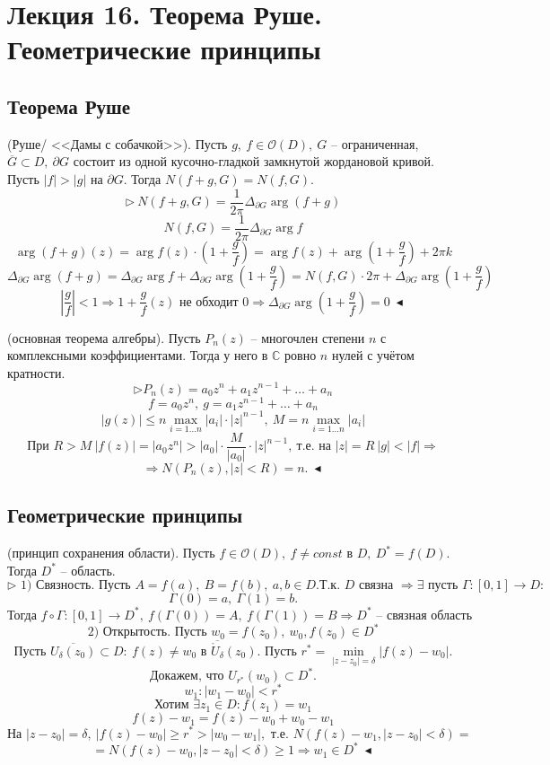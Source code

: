 \section{Лекция 16. Теорема Руше. Геометрические принципы}
\subsection{Теорема Руше}
 (Руше/ <<Дамы с собачкой>>). Пусть $g, \ f \in \mathcal{O}(D), \ G$ -- ограниченная, $\overline{G} \subset D, \ \partial G$ состоит из одной кусочно-гладкой замкнутой жордановой кривой.
Пусть $|f|>|g|$ на $\partial G$. Тогда $N(f+g, G) = N(f, G)$.
\[\triangleright \ N(f+g, G) = \frac{1}{2\pi} \Delta_{\partial G} \arg (f+g)\]
\[N(f, G) = \frac{1}{2\pi} \Delta_{\partial G} \arg f\]
\[\arg (f+g)(z) = \arg f(z) \cdot \left(1+\frac{g}{f}\right)= \arg f(z) + \arg \left(1+\frac{g}{f}\right) + 2\pi k\]
\[\Delta_{\partial G} \arg (f+g) = \Delta_{\partial G} \arg f + \Delta_{\partial G} \arg \left(1+\frac{g}{f}\right) = N(f, G) \cdot 2\pi + \Delta_{\partial G} \arg \left(1+\frac{g}{f}\right)\]
\[\left|\frac{g}{f}\right| < 1 \Rightarrow 1 + \frac{g}{f}(z) \text{ не обходит 0} \Rightarrow \Delta_{\partial G} \arg \left(1+\frac{g}{f}\right) = 0 \ \blacktriangleleft\]

 (основная теорема алгебры). Пусть $P_n(z)$ -- многочлен степени $n$ с комплексными коэффициентами. Тогда у него в $ \mathbb{C}$ ровно $n$ нулей с учётом кратности.
\[\triangleright P_n(z) = a_0 z^n + a_1 z^{n-1} + \ldots + a_n\]
\[f = a_0 z^n, \ g = a_1 z^{n-1} + \ldots + a_n\]
\[|g(z)|  \leq n \max_{i=1\ldots n} |a_i| \cdot |z|^{n-1}, \ M = n \max_{i=1\ldots n} |a_i|\]
\[\text{При } R > M \ |f(z)| = |a_0 z^n| > |a_0| \cdot \frac{M}{|a_0|} \cdot |z|^{n-1}, \ \text{т.е. на } |z| = R \ |g| < |f| \Rightarrow\] 
\[\Rightarrow N(P_n(z), |z| < R) = n. \ \blacktriangleleft\]
\subsection{Геометрические принципы}
 (принцип сохранения области). Пусть $f \in \mathcal{O}(D), \ f \neq const$ в $D, \ D^* = f(D)$. Тогда $D^*$ -- область.
\[\triangleright \text{ 1) Связность. Пусть } A=f(a), \ B = f(b), \ a, b \in D. \text{Т.к. } D \text{ связна } \Rightarrow \exists \text{ пусть } \Gamma:[0, 1] \to D:\]
\[\Gamma(0)=a, \ \Gamma(1) = b.\] 
\[\text{Тогда  } f \circ \Gamma:[0, 1] \to D^*, \ f(\Gamma(0)) = A, \ f(\Gamma(1)) = B \Rightarrow D^* \text{ -- связная область}\]
\[\text{2) Открытость. Пусть }w_0 = f(z_0), \ w_0, f(z_0) \in D^*\]
\[\text{Пусть } \overline{U_\delta (z_0)} \subset D: \ f(z) \neq w_0 \text{ в } \overline{\mathring{U}_\delta}(z_0). \text{ Пусть } r^* = \min_{|z-z_0|=\delta} |f(z) - w_0|.\]
\[\text{Докажем, что } U_{r^*}(w_0) \subset D^*.\]
\[w_1:|w_1-w_0|< r^*\]
\[\text{Хотим } \exists z_1 \in D:f(z_1)=w_1\]
\[f(z) - w_1 = f(z) - w_0 + w_0 - w_1\]
\[\text{На } |z-z_0| = \delta, \ |f(z) - w_0| \geq r^* > |w_0-w_1|, \text{ т.е. } N(f(z)-w_1, |z-z_0|<\delta) =\] 
\[=N(f(z) - w_0, |z-z_0|<\delta) \geq 1 \Rightarrow w_1 \in D^* \ \blacktriangleleft\]

